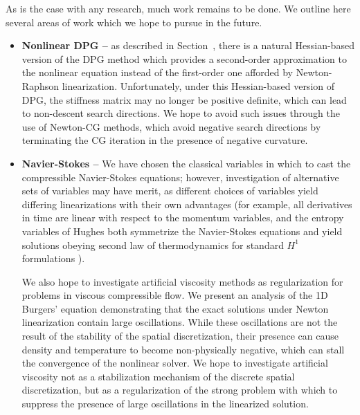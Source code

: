 As is the case with any research, much work remains to be done.  We outline here several areas of work which we hope to pursue in the future.
\begin{itemize}
\item \textbf{Nonlinear DPG --} as described in Section~, there is a natural Hessian-based version of the DPG method which provides a second-order approximation to the nonlinear equation instead of the first-order one afforded by Newton-Raphson linearization.  Unfortunately, under this Hessian-based version of DPG, the stiffness matrix may no longer be positive definite, which can lead to non-descent search directions.  We hope to avoid such issues through the use of Newton-CG methods\cite{Nocedal2006NO}, which avoid negative search directions by terminating the CG iteration in the presence of negative curvature.  
\item \textbf{Navier-Stokes --} We have chosen the classical variables in which to cast the compressible Navier-Stokes equations; however, investigation of alternative sets of variables may have merit, as different choices of variables yield differing linearizations with their own advantages (for example, all derivatives in time are linear with respect to the momentum variables, and the entropy variables of Hughes both symmetrize the Navier-Stokes equations and yield solutions obeying second law of thermodynamics for standard $H^1$ formulations \cite{Hughes1986223}).  

We also hope to investigate artificial viscosity methods as regularization for problems in viscous compressible flow.  We present an analysis of the 1D Burgers' equation demonstrating that the exact solutions under Newton linearization contain large oscillations.  While these oscillations are not the result of the stability of the spatial discretization, their presence can cause density and temperature to become non-physically negative, which can stall the convergence of the nonlinear solver.  We hope to investigate artificial viscosity not as a stabilization mechanism of the discrete spatial discretization, but as a regularization of the strong problem with which to suppress the presence of large oscillations in the linearized solution.  


\end{itemize}
